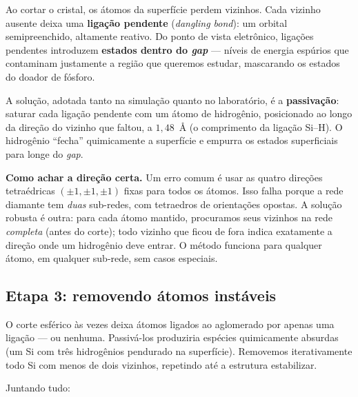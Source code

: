 Ao cortar o cristal, os átomos da superfície perdem vizinhos. Cada vizinho
ausente deixa uma \textbf{ligação pendente} (\emph{dangling bond}): um orbital
semipreenchido, altamente reativo. Do ponto de vista eletrônico, ligações
pendentes introduzem \textbf{estados dentro do \emph{gap}} --- níveis de energia
espúrios que contaminam justamente a região que queremos estudar, mascarando os
estados do doador de fósforo.

A solução, adotada tanto na simulação quanto no laboratório, é a
\textbf{passivação}: saturar cada ligação pendente com um átomo de hidrogênio,
posicionado ao longo da direção do vizinho que faltou, a $1{,}48$~Å (o
comprimento da ligação Si--H). O hidrogênio ``fecha'' quimicamente a superfície e
empurra os estados superficiais para longe do \emph{gap}.

\begin{caixanota}
\textbf{Como achar a direção certa.} Um erro comum é usar as quatro direções
tetraédricas $(\pm1,\pm1,\pm1)$ fixas para todos os átomos. Isso falha porque a
rede diamante tem \emph{duas} sub-redes, com tetraedros de orientações opostas.
A solução robusta é outra: para cada átomo mantido, procuramos seus vizinhos na
rede \emph{completa} (antes do corte); todo vizinho que ficou de fora indica
exatamente a direção onde um hidrogênio deve entrar. O método funciona para
qualquer átomo, em qualquer sub-rede, sem casos especiais.
\end{caixanota}

\subsection{Etapa 3: removendo átomos instáveis}

O corte esférico às vezes deixa átomos ligados ao aglomerado por apenas uma
ligação --- ou nenhuma. Passivá-los produziria espécies quimicamente absurdas
(um Si com três hidrogênios pendurado na superfície). Removemos iterativamente
todo Si com menos de dois vizinhos, repetindo até a estrutura estabilizar.

Juntando tudo:

